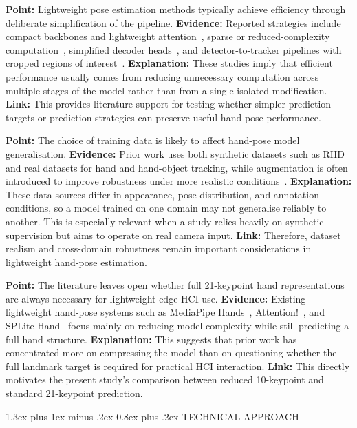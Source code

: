 \documentclass[10pt,letterpaper]{article}
\makeatletter
\renewcommand\section{\@startsection{section}{1}{\z@}%
  {1.3ex plus 1ex minus .2ex}%
  {0.8ex plus .2ex}%
  {\centering\normalfont\small\scshape}}
\makeatother
\begin{document}
\medskip
\noindent\textbf{Point:} Lightweight pose estimation methods typically achieve efficiency through deliberate simplification of the pipeline.  
\textbf{Evidence:} Reported strategies include compact backbones and lightweight attention~\cite{attentionlite}, sparse or reduced-complexity computation~\cite{splitehand}, simplified decoder heads~\cite{efficientpose}, and detector-to-tracker pipelines with cropped regions of interest~\cite{mediapipe}.  
\textbf{Explanation:} These studies imply that efficient performance usually comes from reducing unnecessary computation across multiple stages of the model rather than from a single isolated modification.  
\textbf{Link:} This provides literature support for testing whether simpler prediction targets or prediction strategies can preserve useful hand-pose performance.

\medskip
\noindent\textbf{Point:} The choice of training data is likely to affect hand-pose model generalisation.  
\textbf{Evidence:} Prior work uses both synthetic datasets such as RHD and real datasets for hand and hand-object tracking, while augmentation is often introduced to improve robustness under more realistic conditions~\cite{handobjectgcn,lightweightgcnhand,handaugment}.  
\textbf{Explanation:} These data sources differ in appearance, pose distribution, and annotation conditions, so a model trained on one domain may not generalise reliably to another. This is especially relevant when a study relies heavily on synthetic supervision but aims to operate on real camera input.  
\textbf{Link:} Therefore, dataset realism and cross-domain robustness remain important considerations in lightweight hand-pose estimation.

\medskip
\noindent\textbf{Point:} The literature leaves open whether full 21-keypoint hand representations are always necessary for lightweight edge-HCI use.  
\textbf{Evidence:} Existing lightweight hand-pose systems such as MediaPipe Hands~\cite{mediapipe}, Attention!~\cite{attentionlite}, and SPLite Hand~\cite{splitehand} focus mainly on reducing model complexity while still predicting a full hand structure.  
\textbf{Explanation:} This suggests that prior work has concentrated more on compressing the model than on questioning whether the full landmark target is required for practical HCI interaction.  
\textbf{Link:} This directly motivates the present study's comparison between reduced 10-keypoint and standard 21-keypoint prediction.


\section{TECHNICAL APPROACH}
\end{document}
